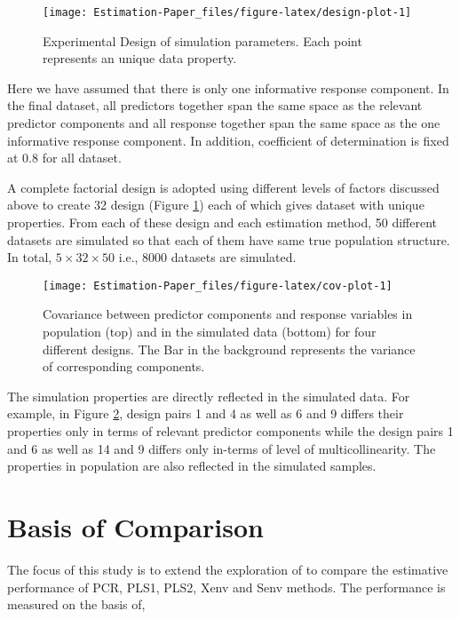 \documentclass[12pt,3p,authoryear]{elsarticle}
\begin{document}
\begin{figure}
\texttt{[image: Estimation-Paper\_files/figure-latex/design-plot-1]} \caption{Experimental Design of simulation parameters. Each point represents an unique data property.}\label{fig:design-plot}
\end{figure}

Here we have assumed that there is only one informative response
component. In the final dataset, all predictors together span the same
space as the relevant predictor components and all response together
span the same space as the one informative response component. In
addition, coefficient of determination is fixed at 0.8 for all dataset.

A complete factorial design is adopted using different levels of factors
discussed above to create 32 design (Figure \ref{fig:design-plot}) each
of which gives dataset with unique properties. From each of these design
and each estimation method, 50 different datasets are simulated so that
each of them have same true population structure. In total,
\(5 \times 32 \times 50\) i.e., 8000 datasets are simulated.






\begin{figure}
\texttt{[image: Estimation-Paper\_files/figure-latex/cov-plot-1]} \caption{Covariance between predictor components and response
variables in population (top) and in the simulated data (bottom) for
four different designs. The Bar in the background represents the
variance of corresponding components.}\label{fig:cov-plot}
\end{figure}

The simulation properties are directly reflected in the simulated data.
For example, in Figure \ref{fig:cov-plot}, design pairs 1 and 4 as well
as 6 and 9 differs their properties only in terms of relevant predictor
components while the design pairs 1 and 6 as well as 14 and 9 differs
only in-terms of level of multicollinearity. The properties in
population are also reflected in the simulated samples.

\section{Basis of Comparison}\label{basis-of-comparison}

The focus of this study is to extend the exploration of
\citet{rimal2019pred} to compare the estimative performance of PCR,
PLS1, PLS2, Xenv and Senv methods. The performance is measured on the
basis of,
\end{document}
